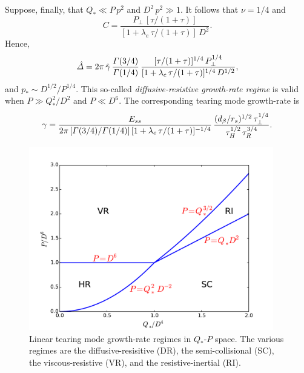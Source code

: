 \documentclass[notitlepage,12pt]{article}
\begin{document}
Suppose, finally, that $Q_\ast \ll P\,p^2$ and $D^2\,p^2\gg 1$. It follows that $\nu=1/4$ and
\begin{equation}
C = \frac{P_\perp\,[\tau/(1+\tau)]}{[1+\lambda_e\,\tau/(1+\tau)]\,D^2}.
\end{equation} 
Hence,
\begin{equation} 
\hat{\mit\Delta} = 2\pi\,\hat{\gamma}\,\frac{{\mit\Gamma}(3/4)}{{\mit\Gamma}(1/4)}\,\frac{[\tau/(1+\tau)]^{1/4}\,P_\perp^{1/4}}{[1+\lambda_e\,\tau/(1+\tau)]^{1/4}\,D^{1/2}},
\end{equation}
and $p_\ast \sim D^{1/2}/P^{1/4}$. This so-called {\em diffusive-resistive growth-rate regime}\/ is valid when $P\gg Q_\ast^2/D^2$ and
$P\ll D^6$. The corresponding tearing mode growth-rate is 
\begin{equation}\label{e371}
\gamma= \frac{E_{ss}}{2\pi\,[{\mit\Gamma}(3/4)/{\mit\Gamma}(1/4)]\,[1+\lambda_e\,\tau/(1+\tau)]^{-1/4}}\,\frac{(d_\beta/r_s)^{1/2}\,\tau_\perp^{1/4}}{\tau_H^{1/2}\,\tau_R^{3/4}}.
\end{equation}

\begin{figure}[t]
\centerline{\includegraphics[width=0.95\textwidth]{RegimeIII.pdf}}
\caption{Linear tearing mode growth-rate regimes  in $Q_\ast$-$P$ space. The various regimes are
the diffusive-resisitive (DR), the semi-collisional (SC),  the viscous-resistive (VR), and the resistive-inertial (RI).}\label{f3}
\end{figure}
\end{document}
